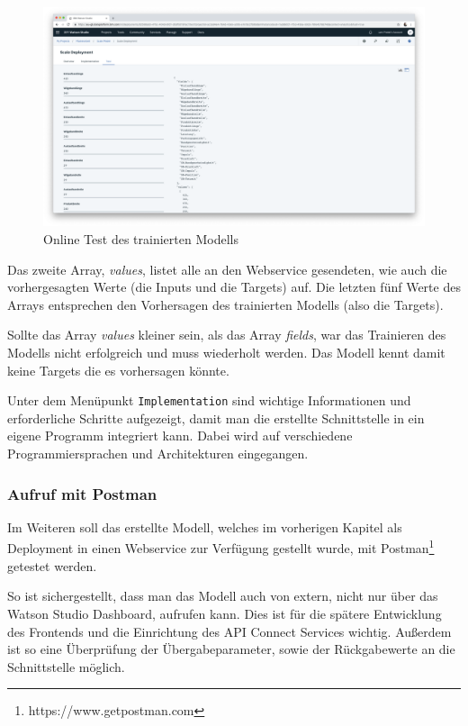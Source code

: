 \begin{figure}[h]
    \centering
    \includegraphics[width=\textwidth]{images/kapitel_3/deployment_test.png}
    \caption{Online Test des trainierten Modells}
    \label{fig:umsetzung_deployment_test}
\end{figure}

Das zweite Array, \textit{values}, listet alle an den Webservice gesendeten, wie auch die vorhergesagten Werte (die
Inputs und die Targets) auf. Die letzten fünf Werte des Arrays entsprechen den Vorhersagen des trainierten Modells (also
die Targets).

Sollte das Array \textit{values} kleiner sein, als das Array \textit{fields}, war das Trainieren des Modells nicht
erfolgreich und muss wiederholt werden. Das Modell kennt damit keine Targets die es vorhersagen könnte.

Unter dem Menüpunkt \texttt{Implementation} sind wichtige Informationen und erforderliche Schritte aufgezeigt, damit
man die erstellte Schnittstelle in ein eigene Programm integriert kann. Dabei wird auf verschiedene Programmiersprachen
und Architekturen eingegangen.

\subsubsection{Aufruf mit Postman}
\label{subsec:Aufruf mit Postman}
Im Weiteren soll das erstellte Modell, welches im vorherigen Kapitel als Deployment in einen Webservice zur Verfügung
gestellt wurde, mit Postman\footnote{https://www.getpostman.com} getestet werden.

So ist sichergestellt, dass man das Modell auch von extern, nicht nur über das Watson Studio Dashboard, aufrufen kann.
Dies ist für die spätere Entwicklung des Frontends und die Einrichtung des API Connect Services wichtig. Außerdem ist
so eine Überprüfung der Übergabeparameter, sowie der Rückgabewerte an die Schnittstelle möglich.

